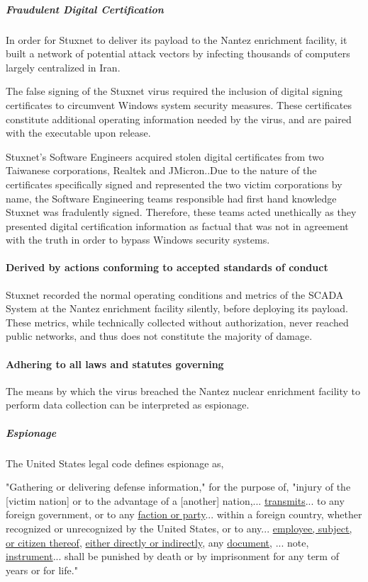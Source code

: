 \documentclass[12pt]{article}
\begin{document}
\begin{multicols}{2}
\subparagraph{Fraudulent Digital Certification}

In order for Stuxnet to deliver its payload to the Nantez enrichment facility, it built a network of potential attack vectors by infecting thousands of computers largely centralized in Iran.

The false signing of the Stuxnet virus required the inclusion of digital signing certificates to circumvent Windows system security measures. These certificates constitute additional operating information needed by the virus, and are paired with the executable upon release.

Stuxnet's Software Engineers acquired stolen digital certificates from two Taiwanese corporations, Realtek and JMicron.\cite{signedUsingCertificates}.Due to the nature of the certificates specifically signed and represented the two victim corporations by name, the Software Engineering teams responsible had first hand knowledge Stuxnet was fradulently signed. Therefore, these teams acted unethically as they presented digital certification information as factual that was not in agreement with the truth in order to bypass Windows security systems. 

\paragraph{Derived by actions conforming to accepted standards of conduct}

Stuxnet recorded the normal operating conditions and metrics of the SCADA System at the Nantez enrichment facility silently, before deploying its payload. These metrics, while technically collected without authorization, never reached public networks, and thus does not constitute the majority of damage.

\paragraph{Adhering to all laws and statutes governing}

The means by which the virus breached the Nantez nuclear enrichment facility to perform data collection can be interpreted as espionage.

\subparagraph{Espionage}

The United States legal code defines espionage as,

\begin{displayquote}
"Gathering or delivering defense information," for the purpose of, "injury of the [victim nation] or to the advantage of a [another] nation,... \ul{transmits}... to any foreign government, or to any \ul{faction or party}... within a foreign country, whether recognized or unrecognized by the United States, or to any... \ul{employee, subject, or citizen thereof}, \ul{either directly or indirectly}, any \ul{document}, ... note, \ul{instrument}... shall be punished by death or by imprisonment for any term of years or for life."\cite{USEspionageLegalDefinition}
\end{displayquote}


\end{multicols}
\end{document}
